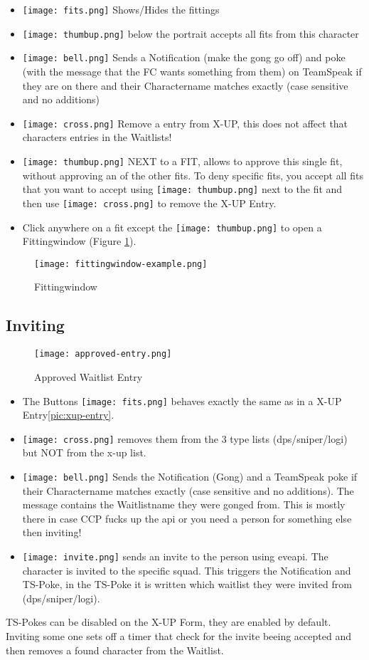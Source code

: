 \documentclass[oneside,a4paper]{article}
\newcommand{\piccross}{\texttt{[image: cross.png]}\xspace}
\newcommand{\picbell}{\texttt{[image: bell.png]}\xspace}
\newcommand{\picfits}{\texttt{[image: fits.png]}\xspace}
\newcommand{\picinvite}{\texttt{[image: invite.png]}\xspace}
\begin{document}
\begin{itemize}
	\item \texttt{[image: fits.png]} Shows/Hides the fittings
	\item \texttt{[image: thumbup.png]} below the portrait accepts all fits from this character
	\item \texttt{[image: bell.png]} Sends a Notification (make the gong go off) and poke (with the message that the FC wants something from them) on TeamSpeak if they are on there and their Charactername matches exactly (case sensitive and no additions)
	\item \piccross Remove a entry from X-UP, this does not affect that characters entries in the Waitlists!
	\item \texttt{[image: thumbup.png]} NEXT to a FIT, allows to approve this single fit, without approving an of the other fits. To deny specific fits, you accept all fits that you want to accept using \texttt{[image: thumbup.png]} next to the fit and then use 
	\piccross to remove the X-UP Entry.
	\item Click anywhere on a fit except the \texttt{[image: thumbup.png]} to open a Fittingwindow (Figure \ref{pic:fittingwindow}).
\end{itemize}
\begin{figure}
	\centering
	\caption{Fittingwindow}
	\label{pic:fittingwindow}
	\texttt{[image: fittingwindow-example.png]}
\end{figure}

\subsection{Inviting}
\begin{figure}[h]
	\centering
	\caption{Approved Waitlist Entry}
	\texttt{[image: approved-entry.png]}
\end{figure}

\begin{itemize}
	\item The Buttons \picfits behaves exactly the same as in a X-UP Entry\ref{pic:xup-entry}.
	\item \piccross removes them from the 3 type lists (dps/sniper/logi) but NOT from the x-up list.
	\item \picbell Sends the Notification (Gong) and a TeamSpeak poke if their Charactername matches exactly (case sensitive and no additions). The message contains the Waitlistname they were gonged from. This is mostly there in case CCP fucks up the api or you need a person for something else then inviting!
	\item \picinvite sends an invite to the person using eveapi. The character is invited to the specific squad. This triggers the Notification and TS-Poke, in the TS-Poke it is written which waitlist they were invited from (dps/sniper/logi).
\end{itemize}
TS-Pokes can be disabled on the X-UP Form, they are enabled by default.
Inviting some one sets off a timer that check for the invite beeing accepted and then removes a found character from the Waitlist.
\end{document}

